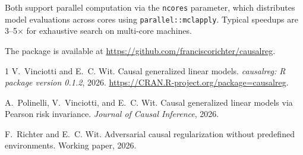 \documentclass[11pt,a4paper]{article}
\begin{document}
Both support parallel computation via the \texttt{ncores} parameter, which distributes model evaluations across cores using \texttt{parallel::mclapply}. Typical speedups are 3--5$\times$ for exhaustive search on multi-core machines.

The package is available at \url{https://github.com/franciscorichter/causalreg}.


\begin{thebibliography}{1}
V.~Vinciotti and E.~C. Wit.
\newblock Causal generalized linear models.
\newblock \emph{causalreg: R package version 0.1.2}, 2026.
\newblock \url{https://CRAN.R-project.org/package=causalreg}.

A.~Polinelli, V.~Vinciotti, and E.~C. Wit.
\newblock Causal generalized linear models via {P}earson risk invariance.
\newblock \emph{Journal of Causal Inference}, 2026.

F.~Richter and E.~C. Wit.
\newblock Adversarial causal regularization without predefined environments.
\newblock Working paper, 2026.
\end{thebibliography}
\end{document}
